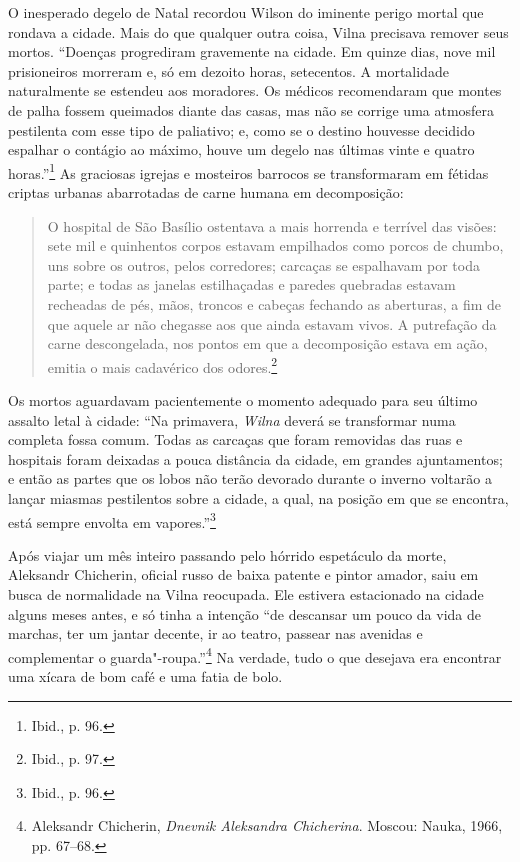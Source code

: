 O inesperado degelo de Natal recordou Wilson do iminente perigo mortal
que rondava a cidade. Mais do que qualquer outra coisa, Vilna precisava
remover seus mortos. ``Doenças progrediram gravemente na cidade. Em
quinze dias, nove mil prisioneiros morreram e, só em dezoito horas,
setecentos. A mortalidade naturalmente se estendeu aos moradores. Os
médicos recomendaram que montes de palha fossem queimados diante das
casas, mas não se corrige uma atmosfera pestilenta com esse tipo de
paliativo; e, como se o destino houvesse decidido espalhar o contágio ao
máximo, houve um degelo nas últimas vinte e quatro horas.''\footnote{Ibid., p. 96.} As graciosas igrejas e mosteiros barrocos se transformaram em
fétidas criptas urbanas abarrotadas de carne humana em decomposição:

\begin{quote}
O hospital de São Basílio ostentava a mais horrenda e terrível das
visões: sete mil e quinhentos corpos estavam empilhados como porcos de
chumbo, uns sobre os outros, pelos corredores; carcaças se espalhavam
por toda parte; e todas as janelas estilhaçadas e paredes quebradas
estavam recheadas de pés, mãos, troncos e cabeças fechando as aberturas,
a fim de que aquele ar não chegasse aos que ainda estavam vivos. A
putrefação da carne descongelada, nos pontos em que a decomposição
estava em ação, emitia o mais cadavérico dos odores.\footnote{Ibid., p. 97.}
\end{quote}  

Os mortos aguardavam pacientemente o momento adequado para seu último
assalto letal à cidade: ``Na primavera, \textit{Wilna} deverá se transformar numa
completa fossa comum. Todas as carcaças que foram removidas das ruas e
hospitais foram deixadas a pouca distância da cidade, em grandes
ajuntamentos; e então as partes que os lobos não terão devorado durante
o inverno voltarão a lançar miasmas pestilentos sobre a cidade, a qual,
na posição em que se encontra, está sempre envolta em
vapores.''\footnote{Ibid., p. 96.}

Após viajar um mês inteiro passando pelo hórrido espetáculo da morte,
Aleksandr Chicherin, oficial russo de baixa patente e pintor amador,
saiu em busca de normalidade na Vilna reocupada. Ele estivera
estacionado na cidade alguns meses antes, e só tinha a intenção ``de
descansar um pouco da vida de marchas, ter um jantar decente, ir ao
teatro, passear nas avenidas e complementar o guarda"-roupa.''\footnote{Aleksandr Chicherin, \textit{Dnevnik Aleksandra Chicherina}. Moscou: Nauka, 1966, pp. 67--68.} Na verdade, tudo o que desejava era encontrar uma xícara de bom café e uma
fatia de bolo.

